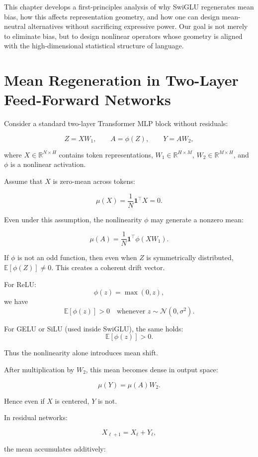 This chapter develops a first-principles analysis of why SwiGLU regenerates
mean bias, how this affects representation geometry, and how one can design
mean-neutral alternatives without sacrificing expressive power.
Our goal is not merely to eliminate bias, but to design nonlinear operators
whose geometry is aligned with the high-dimensional statistical structure of
language.

\section{Mean Regeneration in Two-Layer Feed-Forward Networks}

Consider a standard two-layer Transformer MLP block without residuals:

\begin{equation}
Z = X W_1,
\qquad
A = \phi(Z),
\qquad
Y = A W_2,
\end{equation}

where $X \in \mathbb{R}^{N \times H}$ contains token representations,
$W_1 \in \mathbb{R}^{H \times M}$,
$W_2 \in \mathbb{R}^{M \times H}$,
and $\phi$ is a nonlinear activation.

Assume that $X$ is zero-mean across tokens:

\[
\mu(X) = \frac{1}{N} \mathbf{1}^\top X = 0.
\]

Even under this assumption, the nonlinearity $\phi$ may generate
a nonzero mean:

\[
\mu(A) = \frac{1}{N} \mathbf{1}^\top \phi(XW_1).
\]

If $\phi$ is not an odd function,
then even when $Z$ is symmetrically distributed,
$\mathbb{E}[\phi(Z)] \neq 0$.
This creates a coherent drift vector.

For ReLU:
\[
\phi(z) = \max(0,z),
\]
we have
\[
\mathbb{E}[\phi(z)] > 0
\quad \text{whenever } z \sim \mathcal{N}(0,\sigma^2).
\]

For GELU or SiLU (used inside SwiGLU), the same holds:
\[
\mathbb{E}[\phi(z)] > 0.
\]

Thus the nonlinearity alone introduces mean shift.

After multiplication by $W_2$, this mean becomes dense in output space:

\[
\mu(Y) = \mu(A) W_2.
\]

Hence even if $X$ is centered,
$Y$ is not.

In residual networks:

\[
X_{\ell+1} = X_\ell + Y_\ell,
\]

the mean accumulates additively:

